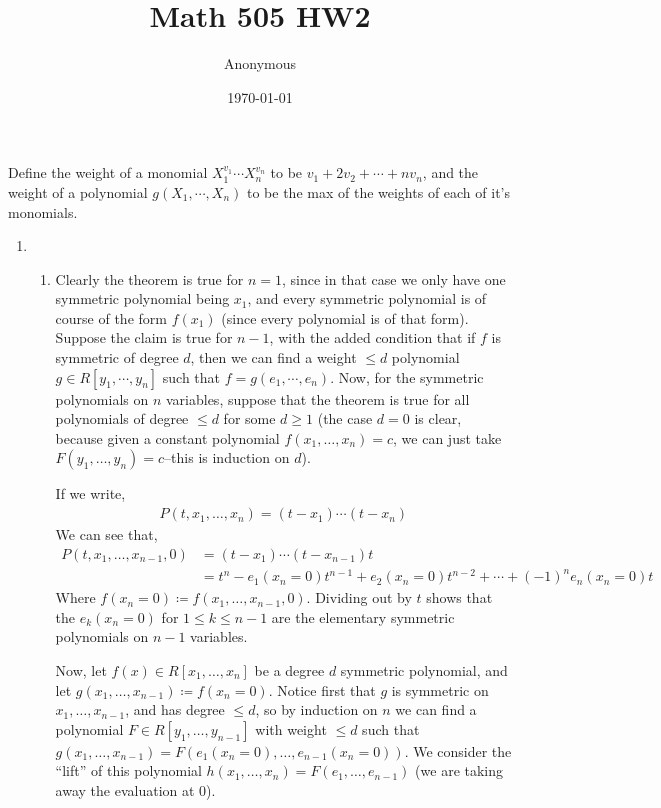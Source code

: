 \documentclass[12pt]{article}
\title{Math 505 HW2}
\date{\today}
\author{Anonymous}
\theoremstyle{definitionstyle}
\newenvironment{definition}{\begin{mydef}}{\end{mydef}}
\begin{document}
	\maketitle
	
	\begin{definition}[Lang IV.6]
		Define the weight of a monomial $X_1^{v_1} \cdots X_n^{v_n}$ to be $v_1 + 2v_2 + \cdots + nv_n$, and the weight of a polynomial $g(X_1, \cdots, X_n)$ to be the max of the weights of each of it's monomials.
	\end{definition}


	\begin{enumerate}[leftmargin=\labelsep]
		\item 	
		\begin{enumerate}
			\item Clearly the theorem is true for $n=1$, since in that case we only have one symmetric polynomial being $x_1$, and every symmetric polynomial is of course of the form $f(x_1)$ (since every polynomial is of that form). Suppose the claim is true for $n-1$, with the added condition that if $f$ is symmetric of degree $d$, then we can find a weight $\leq d$ polynomial $g \in R[y_1, \cdots, y_n]$ such that $f = g(e_1, \cdots, e_n)$. Now, for the symmetric polynomials on $n$ variables, suppose that the theorem is true for all polynomials of degree $\leq d$ for some $d \geq 1$ (the case $d = 0$ is clear, because given a constant polynomial $f(x_1, \ldots, x_n) = c$, we can just take $F(y_1, \ldots, y_n) = c$--this is induction on $d$). 
			
			If we write,
			\begin{align*}
				P(t, x_1, \ldots, x_n) = (t-x_1) \cdots (t-x_n)
			\end{align*}
			We can see that, 
			\begin{align*}
				P(t, x_1, \ldots, x_{n-1}, 0) &= (t-x_1) \cdots (t-x_{n-1})t 
				\\&= t^n - e_1(x_n=0)t^{n-1} + e_2(x_n=0)t^{n-2} + \cdots + (-1)^ne_n(x_n=0)t
			\end{align*}
			Where $f(x_n=0) \coloneqq f(x_1, \ldots, x_{n-1}, 0)$. Dividing out by $t$ shows that the $e_k(x_n=0)$ for $1 \leq k \leq n-1$ are the elementary symmetric polynomials on $n-1$ variables. 
			
			Now, let $f(x) \in R[x_1, \ldots, x_n]$ be a degree $d$ symmetric polynomial, and let $g(x_1, \ldots, x_{n-1}) \coloneqq f(x_n = 0)$. Notice first that $g$ is symmetric on $x_1, \ldots, x_{n-1}$, and has degree $\leq d$, so by induction on $n$ we can find a polynomial $F \in R[y_1, \ldots, y_{n-1}]$ with weight $\leq d$ such that $g(x_1, \ldots, x_{n-1}) = F(e_1(x_n=0), \ldots, e_{n-1}(x_n=0))$. We consider the ``lift'' of this polynomial $h(x_1, \ldots, x_n) = F(e_1, \ldots, e_{n-1})$ (we are taking away the evaluation at 0). 
			

\end{enumerate}
\end{enumerate}
\end{document}
